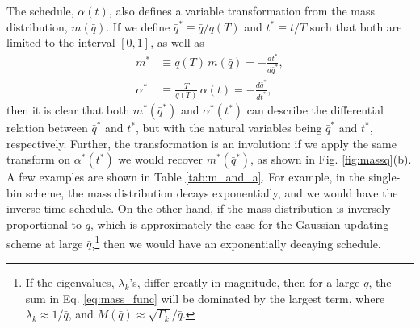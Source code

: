 \documentclass[reprint, superscriptaddress, floatfix]{revtex4-1}
\begin{document}
The schedule, $\alpha(t)$,
also defines a variable transformation from
the mass distribution, $m(\bar q)$.
%
If we define
$\bar q^* \equiv \bar q/q(T)$
and $t^* \equiv t/T$
such that both are limited to the interval $[0, 1]$,
as well as
\begin{align*}
  m^*       &\equiv q(T) \, m(\bar q) = -\frac{ dt^* } { d\bar q^* },
  \\
  \alpha^*  &\equiv \frac{T}{q(T)} \, \alpha(t) = -\frac{ d\bar q^* } { dt^* },
\end{align*}
then it is clear that
both $m^*(\bar q^*)$ and $\alpha^*(t^*)$
can describe the differential relation
between $\bar q^*$ and $t^*$,
but with the natural variables
being $\bar q^*$ and $t^*$, respectively.
%
Further, the transformation is an involution:
if we apply the same transform on $\alpha^*(t^*)$
we would recover $m^*(\bar q^*)$,
as shown in Fig. \ref{fig:massq}(b).
%
A few examples are shown in Table \ref{tab:m_and_a}.
%
For example, in the single-bin scheme,
the mass distribution decays exponentially,
and we would have the inverse-time schedule.
%
On the other hand,
if the mass distribution is inversely proportional to $\bar q$,
which is approximately the case for the Gaussian updating scheme
at large $\bar q$,\footnote{If
  the eigenvalues, $\lambda_k$'s,
  differ greatly in magnitude,
  then for a large $\bar q$,
  the sum in Eq. \eqref{eq:mass_func} will be dominated by
  the largest term, where $\lambda_k \approx 1/\bar q$,
  and $M(\bar q) \approx \sqrt{\Gamma_k}/\bar q$.
  }
then we would have an exponentially decaying schedule.
\end{document}
